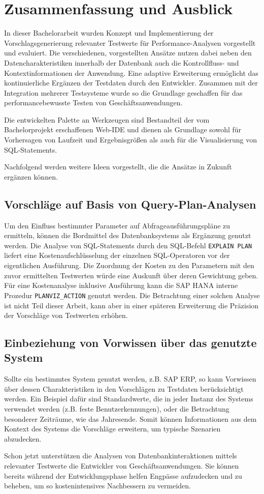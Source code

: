 \section{Zusammenfassung und Ausblick}\label{chap:conclusion}

In dieser Bachelorarbeit wurden Konzept und Implementierung der Vorschlagsgenerierung relevanter Testwerte für Performance-Analysen vorgestellt und evaluiert.
Die verschiedenen, vorgestellten Ansätze nutzen dabei neben den Datencharakteristiken innerhalb der Datenbank auch die Kontrollfluss- und Kontextinformationen der Anwendung.
Eine adaptive Erweiterung ermöglicht das kontinuierliche Ergänzen der Testdaten durch den Entwickler.
Zusammen mit der Integration mehrerer Testsysteme wurde so die Grundlage geschaffen für das performancebewusste Testen von Geschäftsanwendungen.

Die entwickelten Palette an Werkzeugen sind Bestandteil der vom Bachelorprojekt erschaffenen Web-IDE und dienen als Grundlage sowohl für Vorhersagen von Laufzeit und Ergebnisgrößen als auch für die Visualisierung von SQL-Statements.

Nachfolgend werden weitere Ideen vorgestellt, die die Ansätze in Zukunft ergänzen können.

\subsection{Vorschläge auf Basis von Query-Plan-Analysen}
Um den Einfluss bestimmter Parameter auf Abfrageausführungspläne zu ermitteln, können die Bordmittel des Datenbanksystems als Ergänzung genutzt werden.
Die Analyse von SQL-Statements durch den SQL-Befehl \texttt{EXPLAIN PLAN} liefert eine Kostenaufschlüsselung der einzelnen SQL-Operatoren vor der eigentlichen Ausführung.
Die Zuordnung der Kosten zu den Parametern mit den zuvor ermittelten Testwerten würde eine Auskunft über deren Gewichtung geben.
Für eine Kostenanalyse inklusive Ausführung kann die SAP HANA interne Prozedur \texttt{PLANVIZ\_ACTION} genutzt werden.
Die Betrachtung einer solchen Analyse ist nicht Teil dieser Arbeit, kann aber in einer späteren Erweiterung die Präzision der Vorschläge von Testwerten erhöhen.

\subsection{Einbeziehung von Vorwissen über das genutzte System}
Sollte ein bestimmtes System genutzt werden, z.B. SAP ERP, so kann Vorwissen über dessen Charakteristiken in den Vorschlägen zu Testdaten berücksichtigt werden.
Ein Beispiel dafür sind Standardwerte, die in jeder Instanz des Systems verwendet werden (z.B. feste Benutzerkennungen), oder die Betrachtung besonderer Zeiträume, wie das Jahresende.
Somit können Informationen aus dem Kontext des Systems die Vorschläge erweitern, um typische Szenarien abzudecken.


Schon jetzt unterstützen die Analysen von Datenbankinteraktionen mittels relevanter Testwerte die Entwickler von Geschäftsanwendungen.
Sie können bereits während der Entwicklungsphase helfen Engpässe aufzudecken und zu beheben, um so kostenintensives Nachbessern zu vermeiden.